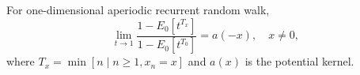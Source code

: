For one-dimensional aperiodic recurrent random walk,
$$\lim_{t \to 1} \frac{1 - E_0[t^{T_x}]}{1 - E_0[t^{T_0}]} = a(-x), \quad x \neq 0,$$
where $T_x = \min[n \mid n \geq 1, x_n = x]$ and $a(x)$ is the potential kernel.
